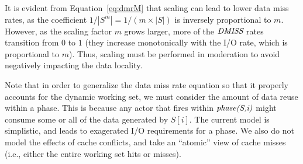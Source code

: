 It is evident from Equation~\ref{eq:dmrM} that scaling can lead to
lower data miss rates, as the coefficient $1/|S^m| = 1/(m \times |S|)$
is inversely proportional to $m$.  However, as the scaling factor $m$
grows larger, more of the $\mbox{\it DMISS}$ rates transition from $0$ to
$1$ (they increase monotonically with the I/O rate, which is
proportional to $m$).  Thus, scaling must be performed in moderation
to avoid negatively impacting the data locality.

Note that in order to generalize the data miss rate equation so that it properly
accounts for the dynamic working set, we must consider the amount of
data reuse within a phase. This is because any actor that fires within
$\mbox{\it phase(S,i)}$ might consume some or all of the data
generated by $S[i]$. The current model is simplistic, and leads to
exagerated I/O requirements for a phase. We also do not model the
effects of cache conflicts, and take an ``atomic'' view of cache
misses (i.e., either the entire working set hits or misses).

